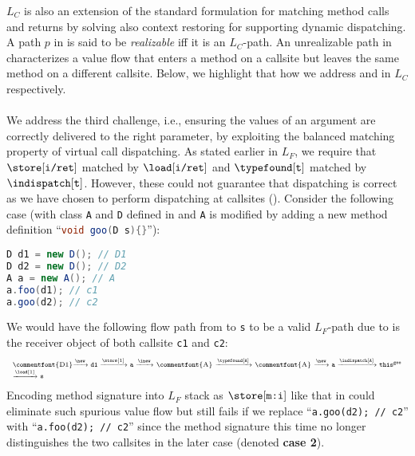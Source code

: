 $L_C$ is also an extension of the standard formulation for matching method 
calls and returns by solving also context restoring for supporting dynamic 
dispatching. A path $p$ in \pag is said to be \emph{realizable} iff it is an $L_C$-path.
An unrealizable path in \pag characterizes a value flow that enters a method 
on a callsite but leaves the same method on a different callsite. Below, we highlight that how we address  and  in $L_C$ respectively. 

\paragraph{ } We address the third challenge, i.e., ensuring the values of an argument are correctly delivered to the right parameter, by exploiting the balanced matching property of virtual call dispatching. As stated earlier in $L_F$, we require that $\store[\texttt{i/ret}]$ matched by $\load[\texttt{i/ret}]$ and $\typefound[\texttt{t}]$ matched by $\indispatch[\texttt{t}]$. However, these could not guarantee that dispatching is correct as we have chosen to perform dispatching at callsites ().
Consider the following case (with class \texttt{A} and \texttt{D} defined in  and \texttt{A} is modified by adding a new method definition ``\lstinline[language=java]!void goo(D s){}!''):
\begin{lstlisting}[language=java, basicstyle=\small, numbers=none]
D d1 = new D(); // D1
D d2 = new D(); // D2
A a = new A(); // A
a.foo(d1); // c1
a.goo(d2); // c2
\end{lstlisting}
We would have the following flow path from  to \texttt{s} to be a valid $L_F$-path due to  is the receiver object of both callsite \texttt{c1} and \texttt{c2}:
\begin{equation} \scriptsize
  \centering
\label{eq:CH3Case1}
\begin{tabular}{l} 
\commentfont{D1}$\xrightarrow{\new}
\texttt{d1}\xrightarrow{\store[1]}
\texttt{a} \xrightarrow{\inew}$ 
\commentfont{A} $\xrightarrow{\typefound[\texttt{A}]}$ \commentfont{A}
$ \xrightarrow{\new} \texttt{a}\xrightarrow{\indispatch[\texttt{A}]} \texttt{this}^{\texttt{goo}}$\\
\scriptsize
$\xrightarrow{\load[1]}\texttt{s}
$
\end{tabular}
\end{equation}
Encoding method signature into $L_F$ stack as $\store[\texttt{m:i}]$ like that in  could eliminate such spurious value flow but still fails if we 
replace ``\lstinline{a.goo(d2); // c2}'' with ``\lstinline{a.foo(d2); // c2}'' since 
the method signature this time no longer distinguishes the two callsites in the later case (denoted \textbf{case 2}). 

